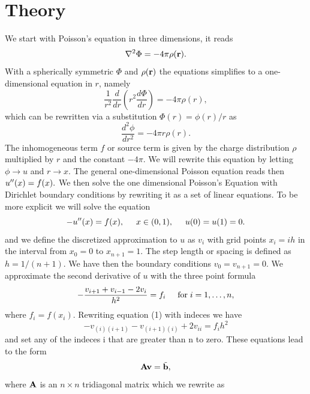 \documentclass[11pt,a4wide]{article}
\begin{document}
\section{Theory}
We start with Poisson's equation in three dimensions, it reads
\[
\nabla^2 \Phi = -4\pi \rho ({\bf r}).
\]
With a spherically symmetric $\Phi$ and $\rho ({\bf r})$  the equations
simplifies to a one-dimensional equation in $r$, namely
\[
\frac{1}{r^2}\frac{d}{dr}\left(r^2\frac{d\Phi}{dr}\right) = -4\pi \rho(r),
\]
which can be rewritten via a substitution $\Phi(r)= \phi(r)/r$ as
\[
\frac{d^2\phi}{dr^2}= -4\pi r\rho(r).
\]
The inhomogeneous term $f$ or source term is given by the charge distribution $\rho$  multiplied by $r$ and the constant $-4\pi$. We will rewrite this equation by letting $\phi\rightarrow u$ and 
$r\rightarrow x$. The general one-dimensional Poisson equation reads then $\-u''(x) = f(x).$
We then solve the one dimensional Poisson's Equation with Dirichlet boundary conditions by rewriting it as a set of linear equations.
To be more explicit we will solve the equation
\[
-u''(x) = f(x), \hspace{0.5cm} x\in(0,1), \hspace{0.5cm} u(0) = u(1) = 0.
\]
and we define the discretized approximation  to $u$ as $v_i$  with 
grid points $x_i=ih$   in the interval from $x_0=0$ to $x_{n+1}=1$.
The step length or spacing is defined as $h=1/(n+1)$. 
We have then the boundary conditions $v_0 = v_{n+1} = 0$.
We  approximate the second derivative of $u$ with the three point formula
\begin{equation}
   -\frac{v_{i+1}+v_{i-1}-2v_i}{h^2} = f_i  \hspace{0.5cm}    
   \mathrm{for} \hspace{0.1cm} i=1,\dots, n, 
\end{equation}
where $f_i=f(x_i)$. Rewriting equation (1) with indeces we have 
\begin{equation}
	-v_{(i)(i+1)}-v_{(i+1)(i)}+2v_{ii}= {f_i}{h^2}
\end{equation}
and set any of the indeces i that are greater than n to zero. These equations lead to the form
\begin{equation}
   {\bf A}{\bf v} = \tilde{{\bf b}},
\end{equation}
where ${\bf A}$ is an $n\times n$  tridiagonal matrix which we rewrite as 
\end{document}

